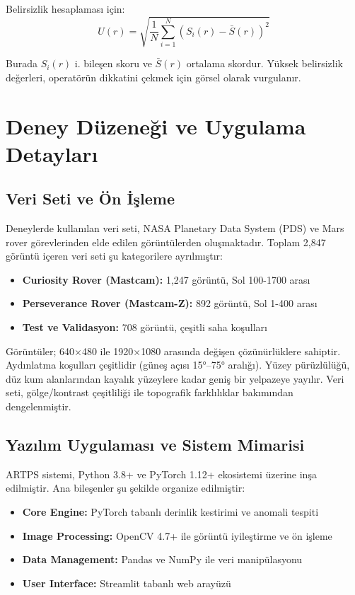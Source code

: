 \documentclass[12pt]{article}
\begin{document}
Belirsizlik hesaplaması için:
\[ U(r) = \sqrt{\frac{1}{N} \sum_{i=1}^{N} (S_i(r) - \bar{S}(r))^2} \]

Burada \(S_i(r)\) i. bileşen skoru ve \(\bar{S}(r)\) ortalama skordur. Yüksek belirsizlik değerleri, operatörün dikkatini çekmek için görsel olarak vurgulanır.

\section{Deney Düzeneği ve Uygulama Detayları}
\subsection{Veri Seti ve Ön İşleme}
Deneylerde kullanılan veri seti, NASA Planetary Data System (PDS) ve Mars rover görevlerinden elde edilen görüntülerden oluşmaktadır. Toplam 2,847 görüntü içeren veri seti şu kategorilere ayrılmıştır:

\begin{itemize}
\item \textbf{Curiosity Rover (Mastcam):} 1,247 görüntü, Sol 100-1700 arası
\item \textbf{Perseverance Rover (Mastcam-Z):} 892 görüntü, Sol 1-400 arası  
\item \textbf{Test ve Validasyon:} 708 görüntü, çeşitli saha koşulları
\end{itemize}

Görüntüler; 640×480 ile 1920×1080 arasında değişen çözünürlüklere sahiptir. Aydınlatma koşulları çeşitlidir (güneş açısı 15°–75° aralığı). Yüzey pürüzlülüğü, düz kum alanlarından kayalık yüzeylere kadar geniş bir yelpazeye yayılır. Veri seti, gölge/kontrast çeşitliliği ile topografik farklılıklar bakımından dengelenmiştir.

\subsection{Yazılım Uygulaması ve Sistem Mimarisi}
ARTPS sistemi, Python 3.8+ ve PyTorch 1.12+ ekosistemi üzerine inşa edilmiştir. Ana bileşenler şu şekilde organize edilmiştir:

\begin{itemize}
\item \textbf{Core Engine:} PyTorch tabanlı derinlik kestirimi ve anomali tespiti
\item \textbf{Image Processing:} OpenCV 4.7+ ile görüntü iyileştirme ve ön işleme
\item \textbf{Data Management:} Pandas ve NumPy ile veri manipülasyonu
\item \textbf{User Interface:} Streamlit tabanlı web arayüzü
\end{itemize}
\end{document}
